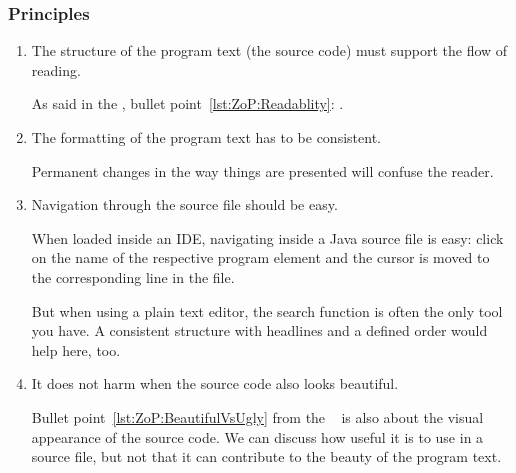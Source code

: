 \subsubsection{Principles}
\begin{enumerate}[label=P\arabic*.]
	\item{The structure of the program text (the source code) must support the flow of reading.
	
	As said in the \ngref, bullet point~\ref{lst:ZoP:Readablity}: .}
	
	\item{The formatting of the program text has to be consistent.
	
	Permanent changes in the way things are presented will confuse the reader.}
	
	\item{Navigation through the source file should be easy.
	
	When loaded inside an IDE, navigating inside a Java source file is easy: click on the name of the respective program element and the cursor is moved to the corresponding line in the file.
	
	But when using a plain text editor, the search function is often the only tool you have. A consistent structure with headlines and a defined order would help here, too.}
	
	\item{It does not harm when the source code also looks beautiful.
	
	Bullet point~\ref{lst:ZoP:BeautifulVsUgly} from the \ngref~ is also about the visual appearance of the source code. We can discuss how useful it is to use  in a source file, but not that it can contribute to the beauty of the program text.}
\end{enumerate}








